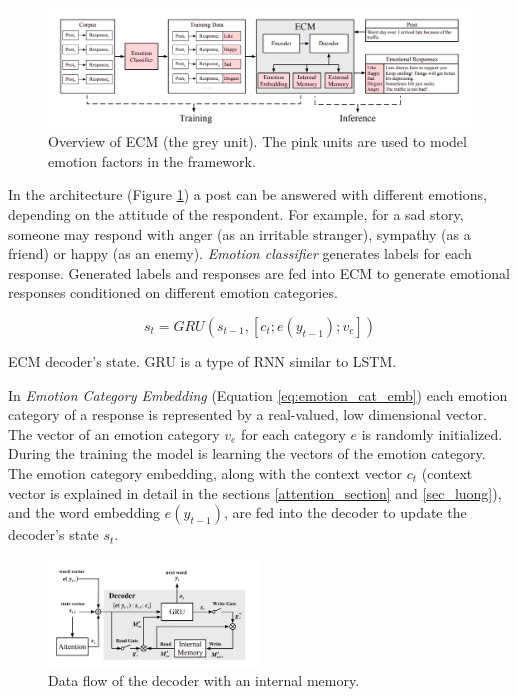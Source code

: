 \begin{figure}[hbt]
  \centering
  \includegraphics[width=1\textwidth]{figures/ecm.png}
  \caption{Overview of ECM (the grey unit). The pink units are used to model emotion factors in the framework.}
  \label{fig:ecm}
\end{figure}

In the architecture (Figure \ref{fig:ecm}) a post can be answered with different emotions, depending on the attitude of the respondent. For example, for a sad story, someone may respond with anger  (as an irritable stranger), sympathy (as a friend) or happy (as an enemy). \textit{Emotion classifier} generates labels for each response. Generated labels and responses are fed into ECM to generate emotional responses conditioned on different emotion categories. 

\begin{eqfloat}
\begin{equation} \label{eq:emotion_cat_emb}
s_t = GRU(s_{t-1},[c_t; e(y_{t-1}); v_e])
\end{equation}
\caption{ECM decoder's state. GRU \cite{cho2014learning} is a type of RNN similar to LSTM.}
\end{eqfloat}

In \textit{Emotion Category Embedding} (Equation \ref{eq:emotion_cat_emb}) each emotion category of a response is represented by a real-valued, low dimensional vector. The vector of an emotion category $v_e$ for each category $e$ is randomly initialized. During the training the model is learning the vectors of the emotion category. The emotion category embedding, along with the context vector $c_t$ (context vector is explained in detail in the sections \ref{attention_section} and \ref{sec_luong}), and the word embedding $e(y_{t-1})$, are fed into the decoder to update the decoder's state $s_t$. 

\begin{figure}[H]
  \centering
  \includegraphics[width=0.5\textwidth]{figures/internal_memory.png}
  \caption{Data flow of the decoder with an internal memory.}
  \label{fig:internal_memory}
\end{figure}

